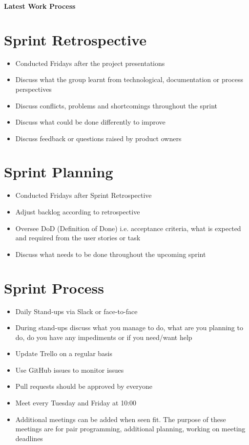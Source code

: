 \documentclass[12pt]{article}
\begin{document}
\centerline{\textbf{\LARGE Latest Work Process}}

\section*{Sprint Retrospective}
\begin{itemize}
	\item Conducted Fridays after the project presentations
	\item Discuss what the group learnt from technological, documentation or process perspectives
  	\item Discuss conflicts, problems and shortcomings throughout the sprint
	\item Discuss what could be done differently to improve 
	\item Discuss feedback or questions raised by product owners
\end{itemize}

\section*{Sprint Planning}
\begin{itemize}
	\item Conducted Fridays after Sprint Retrospective
	\item Adjust backlog according to retrospective
	\item Oversee DoD (Definition of Done) i.e. acceptance criteria, what is expected and required from the user stories or task
	\item Discuss what needs to be done throughout the upcoming sprint
\end{itemize}

\section*{Sprint Process}
\begin{itemize}
	\item Daily Stand-ups via Slack or face-to-face
	\item During stand-ups discuss what  you manage to do, what are you planning to do, do you have any impediments or if you need/want help
	\item Update Trello on a regular basis
	\item Use GitHub issues to monitor issues
	\item Pull requests should be approved by everyone
	\item Meet every Tuesday and Friday at 10:00
	\item Additional meetings can be added when seen fit. The purpose of these meetings are for pair programming, additional planning, working on meeting deadlines
\end{itemize}
\end{document}
